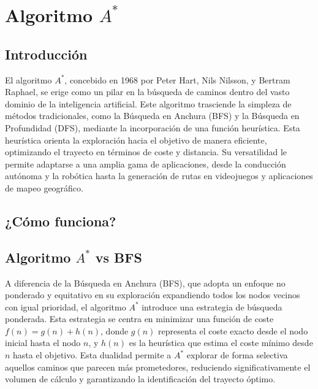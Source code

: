 \section{Algoritmo $A^{*}$}

\subsection*{Introducción}

El algoritmo $A^{*}$, concebido en 1968 por Peter Hart, Nils Nilsson, y Bertram Raphael, se erige como 
un pilar en la búsqueda de caminos dentro del vasto dominio de la inteligencia artificial. Este 
algoritmo trasciende la simpleza de métodos tradicionales, como la Búsqueda en Anchura (BFS) y la 
Búsqueda en Profundidad (DFS), mediante la incorporación de una función heurística. Esta heurística 
orienta la exploración hacia el objetivo de manera eficiente, optimizando el trayecto en términos de 
coste y distancia. Su versatilidad le permite adaptarse a una amplia gama de aplicaciones, desde la 
conducción autónoma y la robótica hasta la generación de rutas en videojuegos y aplicaciones de mapeo 
geográfico.

\subsection*{¿Cómo funciona?}




\subsection*{Algoritmo $A^{*}$ vs BFS}

A diferencia de la Búsqueda en Anchura (BFS), que adopta un enfoque no ponderado y equitativo en su 
exploración expandiendo todos los nodos vecinos con igual prioridad, el algoritmo $A^{*}$ introduce 
una estrategia de búsqueda ponderada. Esta estrategia se centra en minimizar una función de coste 
\(f(n) = g(n) + h(n)\), donde \(g(n)\) representa el coste exacto desde el nodo inicial hasta el nodo 
\(n\), y \(h(n)\) es la heurística que estima el coste mínimo desde \(n\) hasta el objetivo. Esta 
dualidad permite a $A^{*}$ explorar de forma selectiva aquellos caminos que parecen más prometedores, 
reduciendo significativamente el volumen de cálculo y garantizando la identificación del trayecto óptimo.

